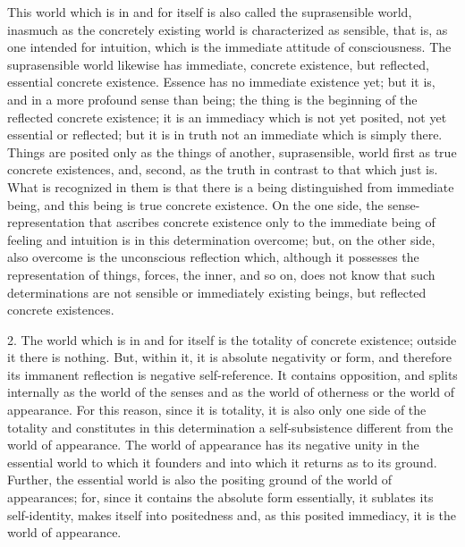 This world which is in and for itself is
also called the suprasensible world,
inasmuch as the concretely existing world
is characterized as sensible,
that is, as one intended for intuition,
which is the immediate attitude of consciousness.
The suprasensible world likewise has
immediate, concrete existence,
but reflected, essential concrete existence.
Essence has no immediate existence yet;
but it is, and in a more profound sense than being;
the thing is the beginning of the reflected concrete existence;
it is an immediacy which is not yet posited,
not yet essential or reflected;
but it is in truth not an immediate which is simply there.
Things are posited only as the
things of another, suprasensible, world
first as true concrete existences,
and, second, as the truth in contrast to that which just is.
What is recognized in them is that there is
a being distinguished from immediate being,
and this being is true concrete existence.
On the one side, the sense-representation
that ascribes concrete existence
only to the immediate being of
feeling and intuition is in this determination overcome;
but, on the other side, also overcome is
the unconscious reflection which,
although it possesses the representation of things,
forces, the inner, and so on, does not know
that such determinations are not sensible
or immediately existing beings,
but reflected concrete existences.

2. The world which is in and for itself is
the totality of concrete existence;
outside it there is nothing.
But, within it, it is absolute negativity or form,
and therefore its immanent reflection is
negative self-reference.
It contains opposition,
and splits internally
as the world of the senses
and as the world of otherness
or the world of appearance.
For this reason, since it is totality,
it is also only one side of the totality
and constitutes in this determination
a self-subsistence different from the world of appearance.
The world of appearance has its negative unity
in the essential world to which it founders
and into which it returns as to its ground.
Further, the essential world is also
the positing ground of the world of appearances;
for, since it contains the absolute form essentially,
it sublates its self-identity,
makes itself into positedness
and, as this posited immediacy,
it is the world of appearance.

